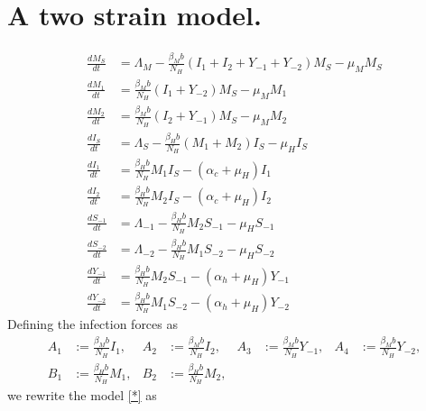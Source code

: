 \section{A two strain model.}
\begin{equation}
	\begin{aligned}
		\frac{dM_S}{dt}&=
			\Lambda_M
			-\frac{\beta_Mb}{N_H}
			(I_1 + I_2 + Y_{-1} + Y_{-2})M_S
			-\mu_MM_S
		\\
		\frac{dM_1}{dt}&=
			\frac{\beta_Mb}{N_H}
			(I_1 + Y_{-2}) M_S - \mu_M M_1
		\\
		\frac{dM_2}{dt}&=
			\frac{\beta_Mb}{N_H}
			(I_2 + Y_{-1}) M_S - \mu_M M_2
		\\
		\frac{dI_S}{dt}&=
			\Lambda_S 
			- \frac{ \beta_H b }{N_H}
				(M_1 + M_2)I_S - \mu_H I_S
		\\
		\frac{dI_1}{dt}&=
			\frac{\beta_Hb}{N_H}
			M_1 I_S - (\alpha_c + \mu_H) I_1
		\\
		\frac{dI_2}{dt}&=
			\frac{\beta_Hb}{N_H} M_2 I_S 
			- ( \alpha_c + \mu_H ) I_2
		\\
		\frac{dS_{-1}}{dt}&=
			\Lambda_{-1}
			-\frac{ \beta_Hb }{N_H} M_2 S_{-1}
			-\mu_HS_{-1}
		\\
		\frac{dS_{-2}}{dt}&=
			\Lambda_{-2}
			-\frac{\beta_Hb}{N_H}M_1S_{-2}
			-\mu_HS_{-2}
		\\
		\frac{dY_{-1}}{dt}&=
			\frac{\beta_Hb}{N_H}
			M_2 S_{-1}
			- (\alpha_h + \mu_H) Y_{-1}
		\\
		\frac{dY_{-2}}{dt}&=
			\frac{\beta_Hb}{N_H}
			M_1 S_{-2}
			-( \alpha_h + \mu_H) Y_{-2}
	\end{aligned}
\end{equation}
Defining the infection forces as
\begin{equation}
	\begin{aligned}
		A_1&:=
			\frac{\beta_Mb}{N_H} I_1,
		&
		A_2&:=
			\frac{\beta_Mb}{N_H} I_2, 
		&
		A_3&:=
			\frac{\beta_Mb}{N_H} Y_{-1},
		&
		A_4&:=
			\frac{\beta_Mb}{N_H} Y_{-2},
		\\
		B_1&:=
			\frac{\beta_Hb}{N_H} M_1, 
		&
		B_2&:=
			\frac{\beta_Hb}{N_H} M_2,
	\end{aligned}
\end{equation}
we rewrite the model \eqref{*} as

